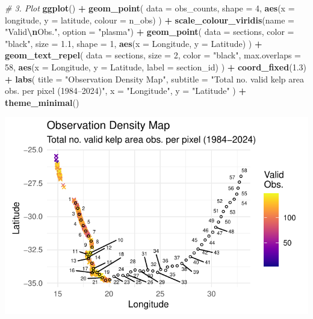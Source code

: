 \documentclass[
  british,
  10pt,
]{article}
\newenvironment{Shaded}{\begin{snugshade}}{\end{snugshade}}
\newcommand{\AttributeTok}[1]{\textcolor[rgb]{0.13,0.29,0.53}{#1}}
\newcommand{\CommentTok}[1]{\textcolor[rgb]{0.56,0.35,0.01}{\textit{#1}}}
\newcommand{\DecValTok}[1]{\textcolor[rgb]{0.00,0.00,0.81}{#1}}
\newcommand{\FloatTok}[1]{\textcolor[rgb]{0.00,0.00,0.81}{#1}}
\newcommand{\FunctionTok}[1]{\textcolor[rgb]{0.13,0.29,0.53}{\textbf{#1}}}
\newcommand{\NormalTok}[1]{#1}
\newcommand{\SpecialCharTok}[1]{\textcolor[rgb]{0.81,0.36,0.00}{\textbf{#1}}}
\newcommand{\StringTok}[1]{\textcolor[rgb]{0.31,0.60,0.02}{#1}}
\begin{document}
\begin{Shaded}
\begin{Highlighting}[]
\CommentTok{\# 3. Plot}
\FunctionTok{ggplot}\NormalTok{() }\SpecialCharTok{+}
  \FunctionTok{geom\_point}\NormalTok{(}
    \AttributeTok{data =}\NormalTok{ obs\_counts, }\AttributeTok{shape =} \DecValTok{4}\NormalTok{,}
    \FunctionTok{aes}\NormalTok{(}\AttributeTok{x =}\NormalTok{ longitude, }\AttributeTok{y =}\NormalTok{ latitude, }\AttributeTok{colour =}\NormalTok{ n\_obs)}
\NormalTok{    ) }\SpecialCharTok{+}
  \FunctionTok{scale\_colour\_viridis}\NormalTok{(}\AttributeTok{name =} \StringTok{"Valid}\SpecialCharTok{\textbackslash{}n}\StringTok{Obs."}\NormalTok{, }\AttributeTok{option =} \StringTok{"plasma"}\NormalTok{) }\SpecialCharTok{+}
  \FunctionTok{geom\_point}\NormalTok{(}
    \AttributeTok{data =}\NormalTok{ sections,}
    \AttributeTok{color =} \StringTok{"black"}\NormalTok{, }\AttributeTok{size =} \FloatTok{1.1}\NormalTok{, }\AttributeTok{shape =} \DecValTok{1}\NormalTok{,}
    \FunctionTok{aes}\NormalTok{(}\AttributeTok{x =}\NormalTok{ Longitude, }\AttributeTok{y =}\NormalTok{ Latitude)}
\NormalTok{    ) }\SpecialCharTok{+}
  \FunctionTok{geom\_text\_repel}\NormalTok{(}
    \AttributeTok{data =}\NormalTok{ sections,}
    \AttributeTok{size =} \DecValTok{2}\NormalTok{,}
    \AttributeTok{color =} \StringTok{"black"}\NormalTok{,}
    \AttributeTok{max.overlaps =} \DecValTok{58}\NormalTok{,}
    \FunctionTok{aes}\NormalTok{(}\AttributeTok{x =}\NormalTok{ Longitude, }\AttributeTok{y =}\NormalTok{ Latitude, }\AttributeTok{label =}\NormalTok{ section\_id)}
\NormalTok{  ) }\SpecialCharTok{+}
  \FunctionTok{coord\_fixed}\NormalTok{(}\FloatTok{1.3}\NormalTok{) }\SpecialCharTok{+}
  \FunctionTok{labs}\NormalTok{(}
    \AttributeTok{title =} \StringTok{"Observation Density Map"}\NormalTok{,}
    \AttributeTok{subtitle =} \StringTok{"Total no. valid kelp area obs. per pixel (1984–2024)"}\NormalTok{,}
    \AttributeTok{x =} \StringTok{"Longitude"}\NormalTok{,}
    \AttributeTok{y =} \StringTok{"Latitude"}
\NormalTok{  ) }\SpecialCharTok{+}
  \FunctionTok{theme\_minimal}\NormalTok{()}
\end{Highlighting}
\end{Shaded}

\begin{center}
\includegraphics[width=0.6\linewidth,height=\textheight,keepaspectratio]{BCB744_Biostats_Prac_Exam_2025_files/figure-pdf/chunk10-1.pdf}
\end{center}
\end{document}
